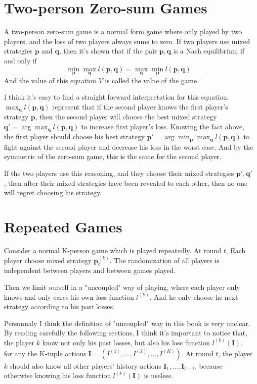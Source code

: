 \documentclass{article} %
\begin{document}
\section{Two-person Zero-sum Games}
A two-person zero-sum game is a normal form game where only played by two players, and the loss of two players always sums to zero. If two players use mixed strategies $\mathbf{p}$ and $\mathbf{q}$, then it's shown that if the pair $\mathbf{p},\mathbf{q}$ is a Nash equilibrium if and only if
$$
\min_{\mathbf{p}} \max_{\mathbf{q}} l(\mathbf{p},\mathbf{q}) = \max_{\mathbf{q}} \min_{\mathbf{p}} l(\mathbf{p},\mathbf{q})
$$
And the value of this equation $V$ is called the value of the game.

I think it's easy to find a straight forward interpretation for this equation. $\max_{\mathbf{q}} l(\mathbf{p},\mathbf{q})$ represent that if the second player knows the first player's strategy $\mathbf{p}$, then the second player will choose the best mixed strategy $\mathbf{q}' = \arg\max_{\mathbf{q}}l(\mathbf{p},\mathbf{q})$ to increase first player's loss. Knowing the fact above, the first player should choose his best strategy $\mathbf{p}' = \arg\min_{\mathbf{p}}\max_{\mathbf{q}}l(\mathbf{p},\mathbf{q})$ to fight against the second player and decrease his loss in the worst case. And by the symmetric of the zero-sum game, this is the same for the second player.

If the two players use this reasoning, and they choose their mixed strategies $\mathbf{p}',\mathbf{q}'$, then after their mixed strategies have been revealed to each other, then no one will regret choosing his strategy.

\section{Repeated Games}
Consider a normal K-person game which is played repeatedly. At round $t$, Each player choose mixed strategy $\mathbf{p}^{(k)}_t$. The randomization of all players is independent between players and between games played.

Then we limit ourself in a "uncoupled" way of playing, where each player only knows and only cares his own loss function $l^{(k)}$. And he only choose he next strategy according to his past losses. 

Personnaly I think the definition of "uncoupled" way in this book is very unclear. By reading carefully the following sections, I think it's important to notice that, the player $k$ know not only his past losses, but also his loss function $l^{(k)}(\mathbf{I})$, for any the K-tuple actions $\mathbf{I}=(I^{(1)},\dots,I^{(k)},\dots,I^{(K)})$. At round $t$, the player $k$ should also know all other players' history actions $\mathbf{I}_1,\dots,\mathbf{I}_{t-1}$, because otherwise knowing his loss function $l^{(k)}(\mathbf{I})$ is useless.
\end{document}
